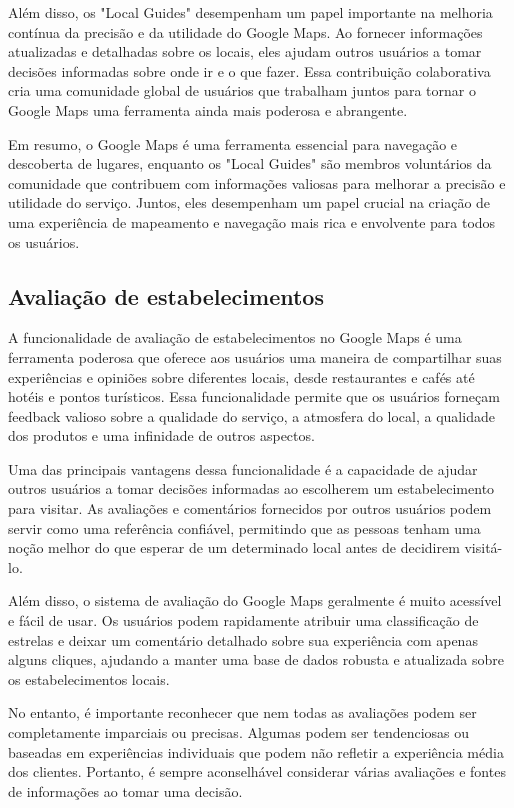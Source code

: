 Além disso, os "Local Guides" desempenham um papel importante na melhoria contínua da precisão e da utilidade do Google Maps. Ao fornecer informações atualizadas e detalhadas sobre os locais, eles ajudam outros usuários a tomar decisões informadas sobre onde ir e o que fazer. Essa contribuição colaborativa cria uma comunidade global de usuários que trabalham juntos para tornar o Google Maps uma ferramenta ainda mais poderosa e abrangente.

Em resumo, o Google Maps é uma ferramenta essencial para navegação e descoberta de lugares, enquanto os "Local Guides" são membros voluntários da comunidade que contribuem com informações valiosas para melhorar a precisão e utilidade do serviço. Juntos, eles desempenham um papel crucial na criação de uma experiência de mapeamento e navegação mais rica e envolvente para todos os usuários.

\subsection{Avaliação de estabelecimentos}
\label{cap:fund_teorica:sec:google_maps:subsec:avaliacao_estabelecimentos}


A funcionalidade de avaliação de estabelecimentos no Google Maps é uma ferramenta poderosa que oferece aos usuários uma maneira de compartilhar suas experiências e opiniões sobre diferentes locais, desde restaurantes e cafés até hotéis e pontos turísticos. Essa funcionalidade permite que os usuários forneçam feedback valioso sobre a qualidade do serviço, a atmosfera do local, a qualidade dos produtos e uma infinidade de outros aspectos.

Uma das principais vantagens dessa funcionalidade é a capacidade de ajudar outros usuários a tomar decisões informadas ao escolherem um estabelecimento para visitar. As avaliações e comentários fornecidos por outros usuários podem servir como uma referência confiável, permitindo que as pessoas tenham uma noção melhor do que esperar de um determinado local antes de decidirem visitá-lo.

Além disso, o sistema de avaliação do Google Maps geralmente é muito acessível e fácil de usar. Os usuários podem rapidamente atribuir uma classificação de estrelas e deixar um comentário detalhado sobre sua experiência com apenas alguns cliques, ajudando a manter uma base de dados robusta e atualizada sobre os estabelecimentos locais.

No entanto, é importante reconhecer que nem todas as avaliações podem ser completamente imparciais ou precisas. Algumas podem ser tendenciosas ou baseadas em experiências individuais que podem não refletir a experiência média dos clientes. Portanto, é sempre aconselhável considerar várias avaliações e fontes de informações ao tomar uma decisão.

